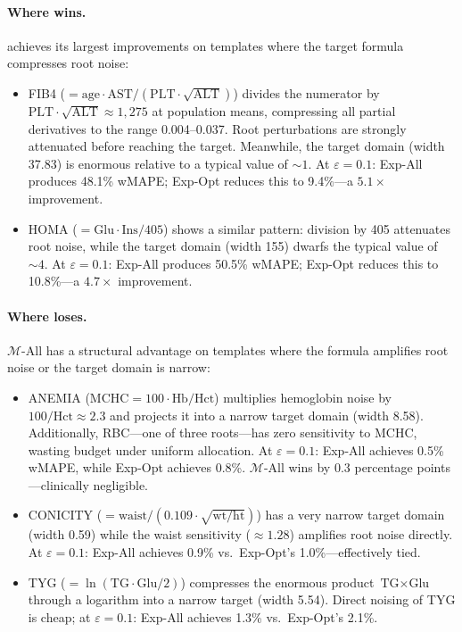 \paragraph{\textbf{Where \sysname{} wins.}}
\sysname{} achieves its largest improvements on templates where the target formula compresses root noise:
\begin{itemize}
    \item FIB4 ($= \text{age} \cdot \text{AST} / (\text{PLT} \cdot \sqrt{\text{ALT}})$) divides the numerator by $\text{PLT} \cdot \sqrt{\text{ALT}} \approx 1{,}275$ at population means, compressing all partial derivatives to the range 0.004--0.037. Root perturbations are strongly attenuated before reaching the target. Meanwhile, the target domain (width 37.83) is enormous relative to a typical value of ${\sim}1$. At $\varepsilon = 0.1$: Exp-All produces 48.1\% wMAPE; Exp-Opt reduces this to 9.4\%---a $5.1\times$ improvement.
    \item HOMA ($= \text{Glu} \cdot \text{Ins} / 405$) shows a similar pattern: division by 405 attenuates root noise, while the target domain (width 155) dwarfs the typical value of ${\sim}4$. At $\varepsilon = 0.1$: Exp-All produces 50.5\% wMAPE; Exp-Opt reduces this to 10.8\%---a $4.7\times$ improvement.
\end{itemize}

\paragraph{\textbf{Where \sysname{} loses.}}
$\mathcal{M}$-All has a structural advantage on templates where the formula amplifies root noise or the target domain is narrow:
\begin{itemize}
    \item ANEMIA ($\text{MCHC} = 100 \cdot \text{Hb} / \text{Hct}$) multiplies hemoglobin noise by $100/\text{Hct} \approx 2.3$ and projects it into a narrow target domain (width 8.58). Additionally, RBC---one of three roots---has zero sensitivity to MCHC, wasting budget under uniform allocation. At $\varepsilon = 0.1$: Exp-All achieves 0.5\% wMAPE, while Exp-Opt achieves 0.8\%. $\mathcal{M}$-All wins by 0.3 percentage points---clinically negligible.
    \item CONICITY ($= \text{waist} / (0.109 \cdot \sqrt{\text{wt}/\text{ht}})$) has a very narrow target domain (width 0.59) while the waist sensitivity (${\approx}1.28$) amplifies root noise directly. At $\varepsilon = 0.1$: Exp-All achieves 0.9\% vs.\ Exp-Opt's 1.0\%---effectively tied.
    \item TYG ($= \ln(\text{TG} \cdot \text{Glu} / 2)$) compresses the enormous product $\text{TG} \times \text{Glu}$ through a logarithm into a narrow target (width 5.54). Direct noising of TYG is cheap; at $\varepsilon = 0.1$: Exp-All achieves 1.3\% vs.\ Exp-Opt's 2.1\%.
\end{itemize}

